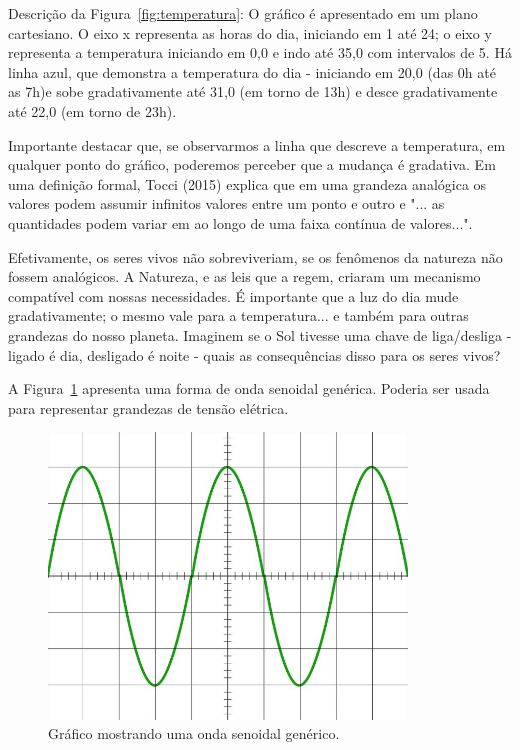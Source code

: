 Descrição da Figura~\ref{fig:temperatura}:  O gráfico é apresentado em um plano cartesiano. O eixo x representa as horas do dia, iniciando em 1 até 24; o eixo y representa a temperatura iniciando em 0,0 e indo até 35,0 com intervalos de 5. Há linha azul, que demonstra a temperatura do dia - iniciando em 20,0 (das 0h até as 7h)e sobe gradativamente até 31,0 (em torno de 13h) e desce gradativamente até 22,0 (em torno de 23h).


Importante destacar que, se observarmos a linha que descreve a temperatura, em qualquer ponto do gráfico, poderemos perceber que a mudança é gradativa. Em uma definição formal, Tocci (2015) explica que em uma grandeza analógica os valores podem assumir infinitos valores entre um ponto e outro e "... as quantidades podem variar em ao longo de uma faixa contínua de valores...".

Efetivamente, os seres vivos não sobreviveriam, se os fenômenos da natureza não fossem analógicos. A Natureza, e as leis que a regem, criaram um mecanismo compatível com nossas necessidades. É importante que a luz do dia mude gradativamente; o mesmo vale para a temperatura... e também para outras grandezas do nosso planeta. Imaginem se o Sol tivesse uma chave de liga/desliga - ligado é dia, desligado é noite - quais as consequências disso para os seres vivos?

A Figura~\ref{fig:senoide} apresenta uma forma de onda senoidal genérica. Poderia ser usada para representar grandezas de tensão elétrica.

\begin{figure}[h]
	\begin{center}
		\includegraphics[width=0.85\textwidth]{img/sinais/senoide.png}
		\caption{Gráfico mostrando uma onda senoidal genérico.}
		\label{fig:senoide}
	\end{center}
\end{figure}

